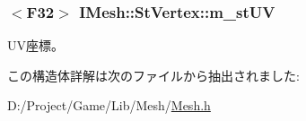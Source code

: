 \hypertarget{struct_i_mesh_1_1_st_vertex_a81cb0271d574730647fdc82a2b5309ad}{}
\subsubsection[{m\+\_\+st\+U\+V}]{$<$F32$>$ I\+Mesh\+::\+St\+Vertex\+::m\+\_\+st\+U\+V}\label{struct_i_mesh_1_1_st_vertex_a81cb0271d574730647fdc82a2b5309ad}


U\+V座標。 



この構造体詳解は次のファイルから抽出されました\+:\begin{DoxyCompactItemize}
\item 
D\+:/\+Project/\+Game/\+Lib/\+Mesh/\hyperlink{_mesh_8h}{Mesh.\+h}\end{DoxyCompactItemize}
